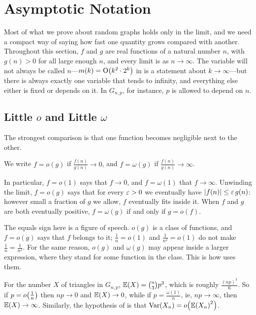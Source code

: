 \section{Asymptotic Notation} \label{Ch1:Sec:Asymptotics}

Most of what we prove about random graphs holds only in the limit, and we need a compact way of saying how fast one quantity grows compared with another. Throughout this section, $f$ and $g$ are real functions of a natural number $n$, with $g(n) > 0$ for all large enough $n$, and every limit is as $n \to \infty$. The variable will not always be called $n$---$m(k) = \operatorname{O}\!\left( k^2 \cdot 2^k \right)$ in  is a statement about $k \to \infty$---but there is always exactly one variable that tends to infinity, and everything else either is fixed or depends on it. In $G_{n, p}$, for instance, $p$ is allowed to depend on $n$.

\subsection{Little $o$ and Little $\omega$}

The strongest comparison is that one function becomes negligible next to the other.

\begin{boxdefinition}
    We write $f = o(g)$ if $\frac{f(n)}{g(n)} \to 0$, and $f = \omega(g)$ if $\frac{f(n)}{g(n)} \to \infty$.
\end{boxdefinition}

In particular, $f = o(1)$ says that $f \to 0$, and $f = \omega(1)$ that $f \to \infty$. Unwinding the limit, $f = o(g)$ says that for every $\varepsilon > 0$ we eventually have $\left\lvert f(n) \right\rvert \leq \varepsilon \, g(n)$: however small a fraction of $g$ we allow, $f$ eventually fits inside it. When $f$ and $g$ are both eventually positive, $f = \omega(g)$ if and only if $g = o(f)$.

The equals sign here is a figure of speech. $o(g)$ is a class of functions, and $f = o(g)$ says that $f$ belongs to it; $\frac{1}{n} = o(1)$ and $\frac{1}{n^2} = o(1)$ do not make $\frac{1}{n} = \frac{1}{n^2}$. For the same reason, $o(g)$ and $\omega(g)$ may appear inside a larger expression, where they stand for some function in the class. This is how  uses them.

\begin{boxexample}
    For the number $X$ of triangles in $G_{n, p}$, $\mathbb{E}(X) = \binom{n}{3} p^3$, which is roughly $\frac{(np)^3}{6}$. So if $p = o\!\left( \frac{1}{n} \right)$ then $np \to 0$ and $\mathbb{E}(X) \to 0$, while if $p = \frac{\omega(1)}{n}$, ie, $np \to \infty$, then $\mathbb{E}(X) \to \infty$. Similarly, the hypothesis of  is that $\operatorname{Var}\!\left( X_n \right) = o\!\left( \mathbb{E}\!\left( X_n \right)^2 \right)$.
\end{boxexample}

